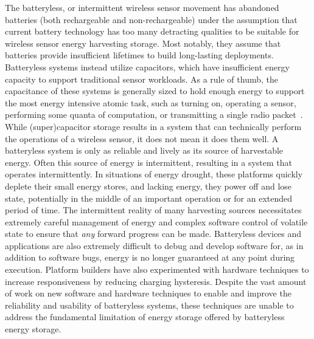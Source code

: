 The batteryless, or intermittent wireless sensor movement has abandoned batteries (both rechargeable and non-rechargeable) under the assumption that current battery technology has too many detracting qualities to be suitable for wireless sensor energy harvesting storage. Most notably, they assume that batteries provide insufficient lifetimes to build long-lasting deployments.
Batteryless systems instead utilize capacitors, which have insufficient energy capacity to support traditional sensor workloads. 
As a rule of thumb, the capacitance of these systems is generally sized to hold enough energy to support the most energy intensive atomic task, such as turning on, operating a sensor, performing some quanta of computation, or transmitting a single radio packet~\cite{nardello2019camaroptera,colinReconfigurable18, shukla2019skinnypower, hesterFlicker17}.
While (super)capacitor storage results in a system that can technically perform the operations of a wireless sensor, it does not mean it does them well.
A batteryless system is only as reliable and lively as its source of harvestable energy.
Often this source of energy is intermittent, resulting in a system that operates intermittently.
In situations of energy drought, 
these platforms quickly deplete their 
small energy stores, and lacking energy,
they power off and lose
state, potentially in the middle of an important operation or for an extended period of time.
The intermittent reality of many harvesting sources necessitates extremely careful management of energy and complex software control of volatile state to ensure that \textit{any} forward progress can be made. 
Batteryless devices and applications are also extremely difficult to debug and develop software for, as in addition to software bugs, energy is no longer guaranteed at any point during execution.
Platform builders have also experimented with hardware techniques to increase responsiveness by reducing charging hysteresis.
Despite the vast amount of work on new software and hardware techniques to enable and improve the reliability and usability of batteryless systems, these techniques are unable to address the fundamental limitation of energy storage offered by batteryless energy storage.


